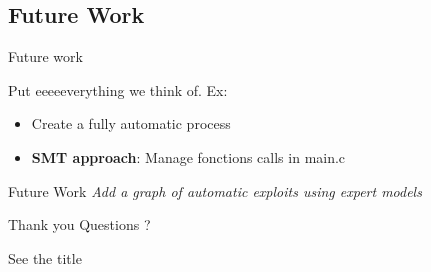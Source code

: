 \documentclass{beamer}
\begin{document}
\subsection{Future Work}
\begin{frame}{Future work}

Put eeeeeverything we think of. Ex:

\begin{itemize}
\item Create a fully automatic process
\item \textbf{SMT approach}: Manage fonctions calls in main.c 
\end{itemize}

\end{frame}

\begin{frame}{Future Work}
\textit{Add a graph of automatic exploits using expert models}
\end{frame}

\begin{frame}{Thank you Questions ?}

See the title

\end{frame}
\end{document}
